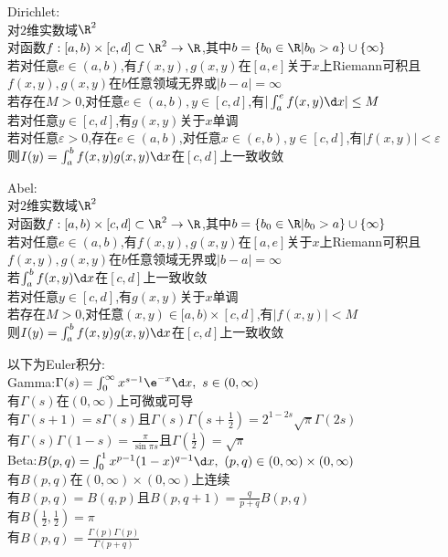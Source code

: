 \begin{dingli}
Dirichlet:\\
对$2$维实数域$\R^2$\\
对函数$f:[a,b)\times[c,d]\subset \R^2 \to \R$,其中$b=\{b_0\in\R|b_0>a\}\cup\{\infty\}$\\
若对任意$e\in(a,b)$,有$f(x,y),g(x,y)$在$[a,e]$关于$x$上Riemann可积且$f(x,y),g(x,y)$在$b$任意领域无界或$|b-a|=\infty$\\
若存在$M>0$,对任意$e\in (a,b),y\in [c,d]$,有$|\int_{a}^{e}f(x,y)\d x|\leq M$\\
若对任意$y\in [c,d]$,有$g(x,y)$关于$x$单调\\
若对任意$\varepsilon>0$,存在$e\in (a,b)$,对任意$x\in(e,b),y\in [c,d]$,有$|f(x,y)|<\varepsilon$\\
则$I(y)=\int_{a}^{b}f(x,y)g(x,y)\d x$在$[c,d]$上一致收敛
\end{dingli}

\begin{dingli}
Abel:\\
对$2$维实数域$\R^2$\\
对函数$f:[a,b)\times[c,d]\subset \R^2 \to \R$,其中$b=\{b_0\in\R|b_0>a\}\cup\{\infty\}$\\
若对任意$e\in(a,b)$,有$f(x,y),g(x,y)$在$[a,e]$关于$x$上Riemann可积且$f(x,y),g(x,y)$在$b$任意领域无界或$|b-a|=\infty$\\
若$\int_{a}^{b}f(x,y)\d x$在$[c,d]$上一致收敛\\
若对任意$y\in [c,d]$,有$g(x,y)$关于$x$单调\\
若存在$M>0$,对任意$(x,y)\in[a,b)\times[c,d]$,有$|f(x,y)|<M$\\
则$I(y)=\int_{a}^{b}f(x,y)g(x,y)\d x$在$[c,d]$上一致收敛
\end{dingli}

\begin{zhu}
以下为Euler积分:\\
Gamma:$\Gamma(s)=\int_{0}^{\infty}x^{s-1}\e^{-x}\d x,\ s\in (0,\infty)$\\
有$\Gamma(s)$在$(0,\infty)$上可微或可导\\
有$\Gamma(s+1)=s\Gamma(s)$且$\Gamma(s)\Gamma(s+\frac{1}{2})=2^{1-2s}\sqrt{\pi}\Gamma(2s)$\\
有$\Gamma(s)\Gamma(1-s)=\frac{\pi}{\sin\pi s}$且$\Gamma(\frac{1}{2})=\sqrt{\pi}$\\
Beta:$B(p,q)=\int_{0}^{1}x^{p-1}(1-x)^{q-1}\d x,\ (p,q)\in(0,\infty)\times(0,\infty)$\\
有$B(p,q)$在$(0,\infty)\times(0,\infty)$上连续\\
有$B(p,q)=B(q,p)$且$B(p,q+1)=\frac{q}{p+q}B(p,q)$\\
有$B(\frac{1}{2},\frac{1}{2})=\pi$\\
有$B(p,q)=\frac{\Gamma(p)\Gamma(p)}{\Gamma(p+q)}$
\end{zhu}

